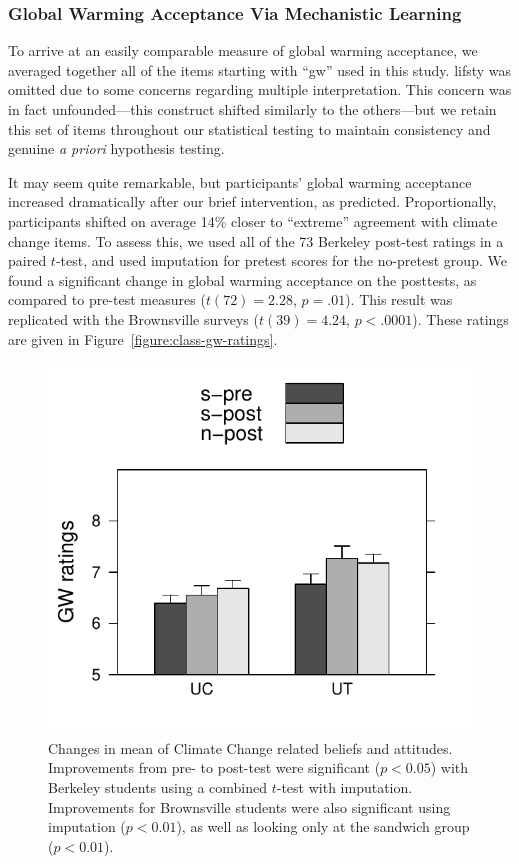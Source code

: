 \subsubsection{Global Warming Acceptance Via Mechanistic Learning}

To arrive at an easily comparable measure of global warming acceptance, we
averaged together all of the items starting with “gw” used in this study.
\textsf{lifsty} was omitted due to some concerns regarding multiple
interpretation. This concern was in fact unfounded---this construct shifted
similarly to the others---but we retain this set of items throughout our
statistical testing to maintain consistency and genuine \emph{a priori}
hypothesis testing. 

It may seem quite remarkable, but participants’ global warming acceptance
increased dramatically after our brief intervention, as predicted.
Proportionally, participants shifted on average 14\% closer to ``extreme''
agreement with climate change items. To assess this, we used all of the 73
Berkeley post-test ratings in a paired $t$-test, and used imputation for pretest
scores for the no-pretest group. We found a significant change in global warming
acceptance on the posttests, as compared to pre-test measures ($t(72) = 2.28$,
$p = .01$). This result was replicated with the Brownsville surveys ($t(39) =
4.24$, $p < .0001$). These ratings are given in
Figure~\ref{figure:class-gw-ratings}.

\begin{figure}
    \centering
    \includegraphics{class-gw-ratings.pdf}
    \caption{Changes in mean of Climate Change related beliefs and attitudes.
        Improvements from pre- to post-test were significant ($p < 0.05$) with
        Berkeley students using a combined $t$-test with imputation.
        Improvements for Brownsville students were also significant using
        imputation ($p < 0.01$), as well as looking only at the sandwich group
        ($p < 0.01$).}
    \label{fig:class-gw-ratings}
\end{figure}

